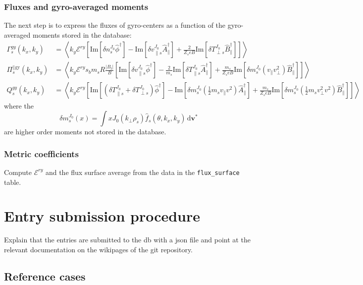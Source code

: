 \documentclass[a4paper]{report}
\begin{document}
 
\subsection{Fluxes and gyro-averaged moments}
The next step is to express the fluxes of gyro-centers as a function of the gyro-averaged moments stored in the database:
\begin{align*}
\Gamma_s^{gy}(k_x,k_y) &= \left<k_y\mathcal{E}^{ry} \left[ \textrm{Im}\left[ \delta n_s^{J_0} \hat{\phi}^\dagger \right] - \textrm{Im}\left[ \delta v_{\parallel s}^{J_0} \hat{A}_\parallel^\dagger \right] + \frac{2}{Z_s e B} \textrm{Im}\left[ \delta T_{\perp s}^{J_0} \hat{B}_\parallel^\dagger \right] \right]\right> \\ 
\Pi_s^{\parallel \textrm{gy}}(k_x,k_y) &= \left<k_y\mathcal{E}^{ry} s_bm_sR\frac{|B_t|}{B}\left[ \textrm{Im}\left[ \delta v_{\parallel s}^{J_0} \hat{\phi}^\dagger \right] - \frac{2}{m_s}\textrm{Im}\left[ \delta T_{\parallel s}^{J_0} \hat{A}_\parallel^\dagger \right] + \frac{m_s}{Z_s e B} \textrm{Im}\left[ \delta m_s^{J_0}(v_\parallel v_\perp^2) \hat{B}_\parallel^\dagger \right] \right]\right> \\
Q_s^{gy}(k_x,k_y) &= \left<k_y\mathcal{E}^{ry} \left[ \textrm{Im}\left[ (\delta T_{\parallel s}^{J_0}+ \delta T_{\perp s}^{J_0} )  \hat{\phi}^\dagger \right] - \textrm{Im}\left[ \delta m_s^{J_0}(\frac{1}{2}m_sv_\parallel v^2) \hat{A}_\parallel^\dagger \right] + \frac{m_s}{Z_s e B} \textrm{Im}\left[ \delta m_s^{J_0}(\frac{1}{2}m_sv_\perp^2 v^2) \hat{B}_\parallel^\dagger \right] \right]\right> \end{align*}
where the
$$\delta m_s^{J_0}(x) = \int x J_0(k_\perp \rho_s)\hat{f}_s(\theta,k_x,k_y) \,\textrm{d}\mathbf{v^*}$$
are higher order moments not stored in the database. 


\subsection{Metric coefficients}
Compute $\mathcal{E}^{ry}$ and the flux surface average from the data in the \texttt{flux\_surface} table.


\chapter{Entry submission procedure}

Explain that the entries are submitted to the db with a json file and point at the relevant documentation on the wikipages of the git repository.
\section{Reference cases}
\end{document}
